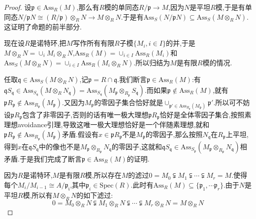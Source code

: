 \begin{enumerate}
\begin{proof}
    	设$\mathfrak{p}\in\mathrm{Ass}_R(M)$,那么有$R$模的单同态$R/\mathfrak{p}\to M$,因为$N$是平坦$R$模,于是有单同态$N/\mathfrak{p}N\cong(R/\mathfrak{p})\otimes_RN\to M\otimes_RN$.于是有$\mathrm{Ass}_S(N/\mathfrak{p}N)\subseteq\mathrm{Ass}_S(M\otimes_RN)$.这证明了命题的前半部分.
    	
    	\qquad
    	
    	现在设$R$是诺特环,把$M$写作所有有限$R$子模$\{M_i,i\in I\}$的并,于是$M\otimes_RN=\cup_iM_i\otimes_RN$,$\mathrm{Ass}_R(M)=\cup_{i\in I}\mathrm{Ass}_R(M_i)$和$\mathrm{Ass}_S(M\otimes_RN)=\cup_{i\in I}\mathrm{Ass}_R(M_i\otimes_RN)$.所以归结为$M$是有限$R$模的情况.
    	
    	\qquad
    	
    	任取$\mathfrak{q}\in\mathrm{Ass}_S(M\otimes_RN)$,记$\mathfrak{p}=R\cap\mathfrak{q}$.我们断言$\mathfrak{p}\in\mathrm{Ass}_R(M)$:有$\mathfrak{q}S_{\mathfrak{q}}\in\mathrm{Ass}_{S_{\mathfrak{q}}}(M\otimes_RN_{\mathfrak{q}})=\mathrm{Ass}_{S_{\mathfrak{q}}}(M_{\mathfrak{p}}\otimes_{R_{\mathfrak{p}}}S_{\mathfrak{q}})$.而如果$\mathfrak{p}\not\in\mathrm{Ass}_R(M)$,就有$\mathfrak{p}R_{\mathfrak{p}}\not\in\mathrm{Ass}_{R_{\mathfrak{p}}}(M_{\mathfrak{p}})$.又因为$M_{\mathfrak{p}}$的零因子集合恰好就是$\cup_{\mathfrak{p}'\in\mathrm{Ass}_{R_{\mathfrak{p}}}(M_{\mathfrak{p}})}\mathfrak{p}'$.所以可不妨设$\mathfrak{p}R_{\mathfrak{p}}$包含了非零因子,否则的话有唯一极大理想$\mathfrak{p}R_{\mathfrak{p}}$恰好是全体零因子集合,按照素理想avoidance引理,导致这唯一极大理想恰好是一个伴随素理想,就和$\mathfrak{p}R_{\mathfrak{p}}\not\in\mathrm{Ass}_{R_{\mathfrak{p}}}(M_{\mathfrak{p}})$矛盾.假设有$x\in\mathfrak{p}R_{\mathfrak{p}}$不是$M_{\mathfrak{p}}$的零因子,那么按照$N_{\mathfrak{q}}$在$R_{\mathfrak{p}}$上平坦,得到$x$在$\mathfrak{q}S_{\mathfrak{q}}$中的像也不是$M_{\mathfrak{p}}\otimes_{R_{\mathfrak{p}}}N_{\mathfrak{q}}$的零因子,这就和$\mathfrak{q}S_{\mathfrak{q}}\in\mathrm{Ass}_{S_{\mathfrak{p}}}(M_{\mathfrak{p}}\otimes_{R_{\mathfrak{p}}}N_{\mathfrak{q}})$相矛盾.于是我们完成了断言$\mathfrak{p}\in\mathrm{Ass}_R(M)$的证明.
    	
    	\qquad
    	
    	因为$R$是诺特环,$M$是有限$R$模,所以存在$M$的滤过$0=M_0\subsetneqq M_1\subsetneqq\cdots\subsetneqq M_r=M$.使得每个$M_i/M_{i-1}\cong A/\mathfrak{p_i}$,其中$\mathfrak{p}_i\in\mathrm{Spec}(R)$.此时有$\mathrm{Ass}_R(M)\subseteq\{\mathfrak{p}_1,\cdots\mathfrak{p}_r\}$.由于$N$是平坦$R$模,所以有$M\otimes_RN$的如下滤过:
    	$$0=M_0\otimes_RN\subsetneqq M_1\otimes_RN\subsetneqq\cdots\subsetneqq M_r\otimes_RN=M\otimes_RN$$
    	

\end{proof}
\end{enumerate}
